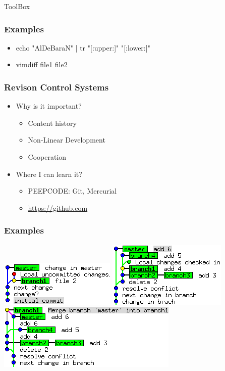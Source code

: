 \documentclass[fleqn]{beamer}
\begin{document}
\begin{section}{ToolBox}
\begin{frame}\frametitle{Examples}
  \begin{itemize}
    \item echo "AlDeBaraN" | tr "[:upper:]" "[:lower:]"
    \item vimdiff file1 file2
  \end{itemize}
  \end{frame}


  \begin{frame}\frametitle{Revison Control Systems}
  \begin{itemize}
    \item{Why is it important?}
      \begin{itemize}
      \item Content history
      \item Non-Linear Development
      \item Cooperation
      \end{itemize}
    \item{Where I can learn it?}
      \begin{itemize}
        \item PEEPCODE: Git, Mercurial
        \item \url{https://github.com}
      \end{itemize}
  \end{itemize}
  \end{frame}


\begin{frame}\frametitle{Examples}
      \includegraphics[scale = .5]{git1}    
      \includegraphics[scale = .5]{git2}    
      \includegraphics[scale = .5]{git4}    
\end{frame}



\end{section}
\end{document}
